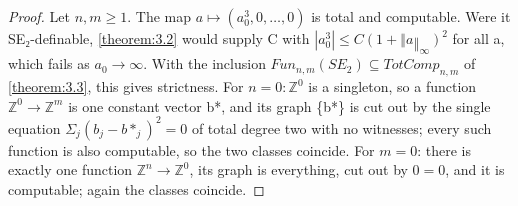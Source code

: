 \begin{proof}
Let $n, m ≥ 1$. The map $a ↦ (a_{0}^{3}, 0, …, 0)$ is total and computable. Were it SE₂-definable, \cref{theorem:3.2} would supply C with $|a_{0}^{3}| ≤ C(1+‖a‖_{∞})^{2}$ for all a, which fails as $a_{0} → ∞$. With the inclusion $Fun_{n,m}(SE_{2}) ⊆ TotComp_{n,m}$ of \cref{theorem:3.3}, this gives strictness. For $n = 0: ℤ^{0}$ is a singleton, so a function $ℤ^{0} → ℤ^{m}$ is one constant vector b*, and its graph \{b*\} is cut out by the single equation $Σ_{j} (b_{j} − b*_{j})^{2} = 0$ of total degree two with no witnesses; every such function is also computable, so the two classes coincide. For $m = 0$: there is exactly one function $ℤ^{n} → ℤ^{0}$, its graph is everything, cut out by $0 = 0$, and it is computable; again the classes coincide.

\end{proof}
